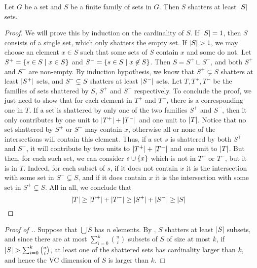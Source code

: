     \begin{lemma} \label{lem:pajor}
        Let $G$ be a set and $S$ be a finite family of sets in $G$.
        Then $S$ shatters at least $| S |$ sets.
        \begin{proof}
            We will prove this by induction on the cardinality of $S$.
            If $| S | = 1$, then $S$ consists of a single set, which only shatters the empty set.
            If $| S | > 1$, we may choose an element $x \in S$ such that some sets of $S$ contain $x$ and some do not.
            Let $S^+ = \{ s \in S \mid x \in S \}$ and $S^- = \{ s \in S \mid x \not\in S \}$.
            Then $S = S^+ \sqcup S^-$, and both $S^+$ and $S^-$ are non-empty.
            By induction hypothesis, we know that $S^+ \subsetneq S$ shatters at least $| S^+ |$ sets,
            and $S^- \subsetneq S$ shatters at least $| S^- |$ sets.
            Let $T, T^+, T^-$ be the families of sets shattered by $S$, $S^+$ and $S^-$ respectively.
            To conclude the proof, we just need to show that for each element in $T^+$ and $T^-$, there is a corresponding
            one in $T$.
            If a set is shattered by only one of the two families $S^+$ and $S^-$, then it only contributes by one unit
            to $| T^+ | + | T^- |$ and one unit to $| T |$.
            Notice that no set shattered by $S^+$ or $S^-$ may contain $x$, otherwise all or none of the intersections
            will contain this element.
            Thus, if a set $s$ is shattered by both $S^+$ and $S^-$, it will contribute by two units to
            $| T^+ | + | T^- |$ and one unit to $| T |$.
            But then, for each such set, we can consider $s \cup \{ x \}$ which is not in $T^+$ or $T^-$, but it is in $T$.
            Indeed, for each subset of $s$, if it does not contain $x$ it is the intersection with some
            set in $S^- \subsetneq S$, and if it does contain $x$ it is the intersection with some set in $S^+ \subsetneq S$.
            All in all, we conclude that
            \[
                | T | \geq | T^+ | + | T^- | \geq | S^+ | + | S^- |
                                \geq | S |
            \]
        \end{proof}
    \end{lemma}

    \begin{proof}[Proof of .]
        Suppose that $\bigcup S$ has $n$ elements.
        By , $S$ shatters at least $| S |$ subsets, and since there are at most
        $\sum_{i=0}^k \binom{n}{i}$ subsets of $S$ of size at most $k$, if
        $| S | > \sum_{i=0}^k \binom{n}{i}$, at least one of the shattered sets has cardinality larger than $k$,
        and hence the VC dimension of $S$ is larger than $k$.
    \end{proof}

